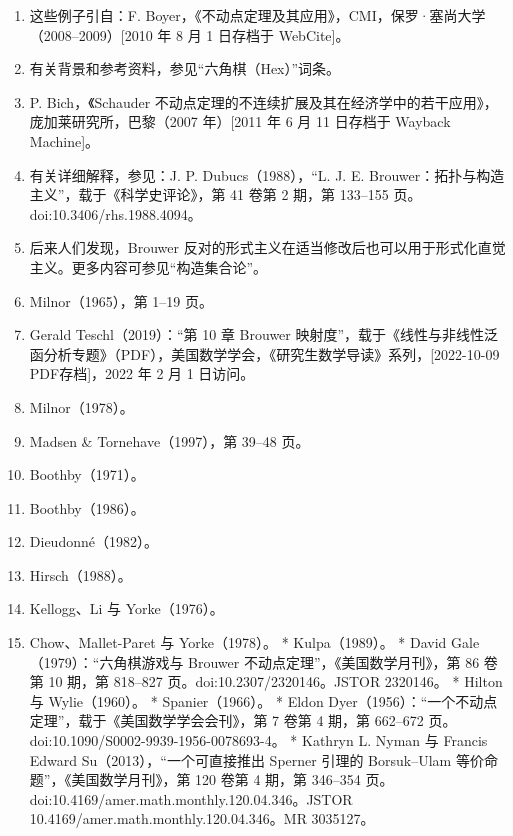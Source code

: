 \begin{enumerate}
\item 这些例子引自：F. Boyer，《不动点定理及其应用》，CMI，保罗·塞尚大学（2008–2009）[2010 年 8 月 1 日存档于 WebCite]。
\item 有关背景和参考资料，参见“六角棋（Hex）”词条。
\item P. Bich，《Schauder 不动点定理的不连续扩展及其在经济学中的若干应用》，庞加莱研究所，巴黎（2007 年）[2011 年 6 月 11 日存档于 Wayback Machine]。
\item 有关详细解释，参见：J. P. Dubucs（1988），“L. J. E. Brouwer：拓扑与构造主义”，载于《科学史评论》，第 41 卷第 2 期，第 133–155 页。doi:10.3406/rhs.1988.4094。
\item 后来人们发现，Brouwer 反对的形式主义在适当修改后也可以用于形式化直觉主义。更多内容可参见“构造集合论”。
\item Milnor（1965），第 1–19 页。
\item Gerald Teschl（2019）：“第 10 章 Brouwer 映射度”，载于《线性与非线性泛函分析专题》（PDF），美国数学学会，《研究生数学导读》系列，[2022-10-09 PDF存档]，2022 年 2 月 1 日访问。
\item Milnor（1978）。
\item Madsen & Tornehave（1997），第 39–48 页。
\item Boothby（1971）。
\item Boothby（1986）。
\item Dieudonné（1982）。
\item Hirsch（1988）。
\item Kellogg、Li 与 Yorke（1976）。
\item Chow、Mallet-Paret 与 Yorke（1978）。
* Kulpa（1989）。
* David Gale（1979）：“六角棋游戏与 Brouwer 不动点定理”，《美国数学月刊》，第 86 卷第 10 期，第 818–827 页。doi:10.2307/2320146。JSTOR 2320146。
* Hilton 与 Wylie（1960）。
* Spanier（1966）。
* Eldon Dyer（1956）：“一个不动点定理”，载于《美国数学学会会刊》，第 7 卷第 4 期，第 662–672 页。doi:10.1090/S0002-9939-1956-0078693-4。
* Kathryn L. Nyman 与 Francis Edward Su（2013），“一个可直接推出 Sperner 引理的 Borsuk–Ulam 等价命题”，《美国数学月刊》，第 120 卷第 4 期，第 346–354 页。doi:10.4169/amer.math.monthly.120.04.346。JSTOR 10.4169/amer.math.monthly.120.04.346。MR 3035127。

\end{enumerate}
